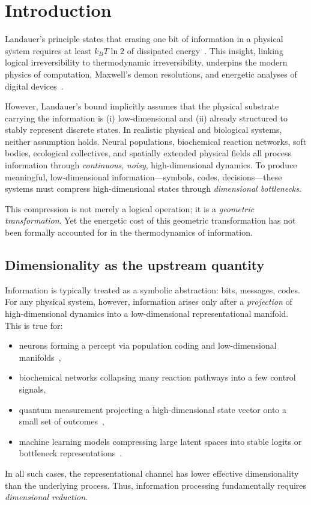 \documentclass[12pt]{article}
\begin{document}
\section{Introduction}

Landauer's principle states that erasing one bit of information in a physical system requires at least $k_B T \ln 2$ of dissipated energy~\citep{landauer1961,berut2012}. This insight, linking logical irreversibility to thermodynamic irreversibility, underpins the modern physics of computation, Maxwell's demon resolutions, and energetic analyses of digital devices~\citep{bennett1982,parrondo2015}.

However, Landauer's bound implicitly assumes that the physical substrate carrying the information is (i) low-dimensional and (ii) already structured to stably represent discrete states. In realistic physical and biological systems, neither assumption holds. Neural populations, biochemical reaction networks, soft bodies, ecological collectives, and spatially extended physical fields all process information through \emph{continuous}, \emph{noisy}, high-dimensional dynamics. To produce meaningful, low-dimensional information---symbols, codes, decisions---these systems must compress high-dimensional states through \emph{dimensional bottlenecks}.

This compression is not merely a logical operation; it is a \emph{geometric transformation}. Yet the energetic cost of this geometric transformation has not been formally accounted for in the thermodynamics of information.

\subsection{Dimensionality as the upstream quantity}

Information is typically treated as a symbolic abstraction: bits, messages, codes. For any physical system, however, information arises only after a \emph{projection} of high-dimensional dynamics into a low-dimensional representational manifold. This is true for:
\begin{itemize}
\item neurons forming a percept via population coding and low-dimensional manifolds~\citep{cunningham2014,gallego2017},
\item biochemical networks collapsing many reaction pathways into a few control signals,
\item quantum measurement projecting a high-dimensional state vector onto a small set of outcomes~\citep{zurek2003},
\item machine learning models compressing large latent spaces into stable logits or bottleneck representations~\citep{tishby2000,shwartzziv2017}.
\end{itemize}
In all such cases, the representational channel has lower effective dimensionality than the underlying process. Thus, information processing fundamentally requires \emph{dimensional reduction}.
\end{document}
